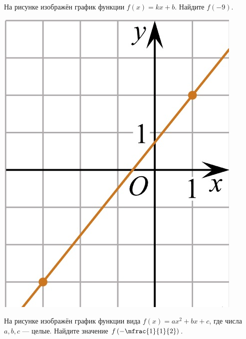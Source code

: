 \begin{consultation}
	\begin{listofex}
		\item
		\begin{minipage}[t]{\bodywidth}
			На рисунке изображён график функции \(f(x)=kx+b\). Найдите \(f(-9)\).
		\end{minipage}
		\hspace{0.02\linewidth}
		\begin{minipage}[t]{\picwidth}
			\includegraphics[align=t, width=\textwidth]{../pics/G101M4C4-1.jpg}
		\end{minipage}
		\item
		\begin{minipage}[t]{\bodywidth}
			На рисунке изображён график функции вида \(f(x)=ax^2+bx+c\), где числа \(a, b, c\) --- целые. Найдите значение \(f\left( -\mfrac{1}{1}{2} \right)\).
		\end{minipage}
		\hspace{0.02\linewidth}

\end{listofex}
\end{consultation}
